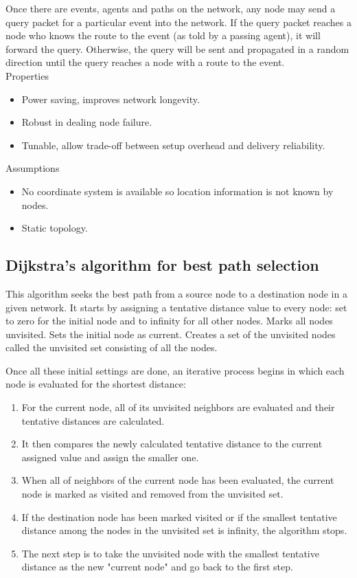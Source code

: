 Once there are events, agents and paths on the network, any node may send a query packet for a particular event into the network. 
If the query packet reaches a node who knows the route to the event (as told by a passing agent), it will forward the query. 
Otherwise, the query will be sent and propagated in a random direction until the query reaches a node with a route to the event. \\

\noindent Properties
\begin{itemize}[noitemsep]
	\item Power saving, improves network longevity.
	\item Robust in dealing node failure.
	\item Tunable, allow trade-off between setup overhead and delivery reliability.
\end{itemize}

\noindent Assumptions
\begin{itemize}[noitemsep]
	\item No coordinate system is available so location information is not known by nodes.
	\item Static topology.
\end{itemize}

\subsection{Dijkstra's algorithm for best path selection}
\label{sec:dijkstra}
This algorithm seeks the best path from a source node to a destination node in a given network.
It starts by assigning a tentative distance value to every node: set to zero for the initial node and to infinity for all other nodes.
Marks all nodes unvisited. Sets the initial node as current. Creates a set of the unvisited nodes called the unvisited set consisting of all the nodes.

Once all these initial settings are done, an iterative process begins in which each node is evaluated for the shortest distance:
\begin{enumerate}[noitemsep]
	\item For the current node, all of its unvisited neighbors are evaluated and their tentative distances are calculated.
	\item It then compares the newly calculated tentative distance to the current assigned value and assign the smaller one. 
	\item When all of neighbors of the current node has been evaluated, the current node is marked as visited and removed from the unvisited set. 
	\item If the destination node has been marked visited or if the smallest tentative distance among the nodes in the unvisited set is infinity, the algorithm stops.
	\item The next step is to take the unvisited node with the smallest tentative distance as the new "current node" and go back to the first step.
\end{enumerate}

